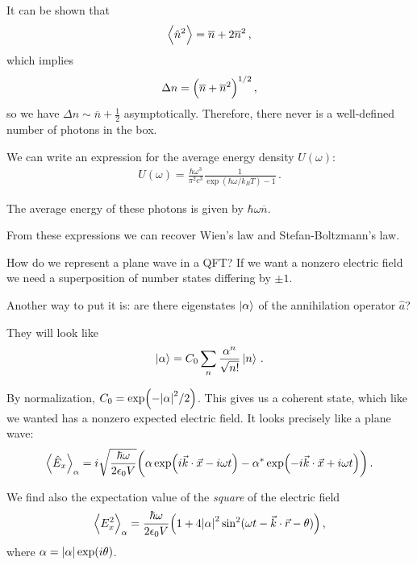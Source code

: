\documentclass[main.tex]{subfiles}
\begin{document}
It can be shown that 
%
\begin{align}
\expval{\hat{n}^2 } = \overline{n}  +2 \overline{n}^2
\,,
\end{align}
%
which implies 
%
\begin{align}
\Delta n = \qty(\overline{n} + \overline{n}^2)^{1/2}
\,,
\end{align}
%
so we have \(\Delta n \sim \overline{n} + \frac{1}{2}\) asymptotically. Therefore, there never is a well-defined number of photons in the box. 

We can write an expression for the average energy density \(U(\omega )\): 
%
\begin{align}
U(\omega ) = \frac{\hbar \omega^3}{\pi^2c^3} \frac{1}{\exp(\hbar \omega / k_B T) - 1}
\,.
\end{align}

The average energy of these photons is given by \(\hbar
 \omega \overline{n}\). 

From these expressions we can recover Wien's law and Stefan-Boltzmann's law. 

How do we represent a plane wave in a QFT? 
If we want a nonzero electric field we need a superposition of number states differing by \(\pm 1\). 

Another way to put it is: are there eigenstates \(\ket{\alpha }\) of the annihilation operator \(\hat{a}\)? 

They will look like 
%
\begin{align}
\ket{\alpha } = C_0 \sum _{n} \frac{\alpha^{n}}{\sqrt{n!}} \ket{n}
\,.
\end{align}

By normalization, \(C_0 = \exp( - \abs{\alpha }^2 / 2)\). This gives us a coherent state, which like we wanted has a nonzero expected electric field. It looks precisely like a plane wave: 
%
\begin{align}
\expval{\hat{E}_{x}}_{\alpha } = i \sqrt{\frac{\hbar \omega }{2 \epsilon_0 V }} \qty(\alpha \exp(i \vec{k} \cdot \vec{x} - i \omega t) - \alpha^{*} \exp(-i \vec{k} \cdot \vec{x} + i \omega t))
\,.
\end{align}

We find also the expectation value of the \emph{square} of the electric field 
%
\begin{align}
\expval{E^2_{x} }_{\alpha } = \frac{\hbar \omega }{2 \epsilon_0 V} \qty(1 + 4 \abs{\alpha }^2 \sin^2 (\omega t - \vec{k} \cdot \vec{r} - \theta ))
\,,
\end{align}
%
where \(\alpha = \abs{\alpha } \exp(i \theta )\). 
\end{document}
